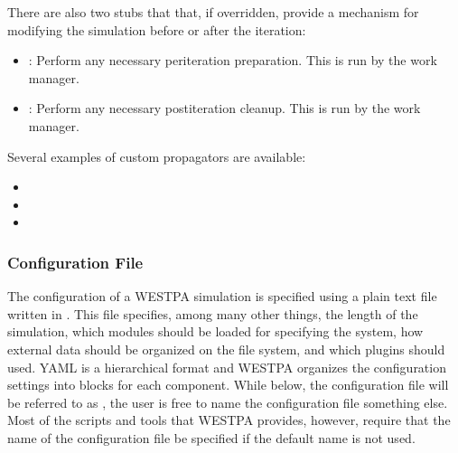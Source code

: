 \documentclass[letterpaper,10pt,english]{sphinxmanual}
\begin{document}
There are also two stubs that that, if overridden, provide a mechanism for
modifying the simulation before or after the iteration:
\begin{itemize}
\item {} 
: Perform any necessary
per\sphinxhyphen{}iteration preparation. This is run by the work manager.

\item {} 
: Perform any necessary
post\sphinxhyphen{}iteration cleanup. This is run by the work manager.

\end{itemize}

Several examples of custom propagators are available:
\begin{itemize}
\item {} 

\item {} 

\item {} 

\end{itemize}


\subsubsection{Configuration File}
\label{\detokenize{users_guide/west/setup:configuration-file}}
The configuration of a WESTPA simulation is specified using a plain text file
written in . This file specifies,
among many other things, the length of the simulation, which modules should be
loaded for specifying the system, how external data should be organized on the
file system, and which plugins should used. YAML is a hierarchical format and
WESTPA organizes the configuration settings into blocks for each component.
While below, the configuration file will be referred to as , the
user is free to name the configuration file something else. Most of the scripts
and tools that WESTPA provides, however, require that the name of the
configuration file be specified if the default name is not used.
\end{document}
